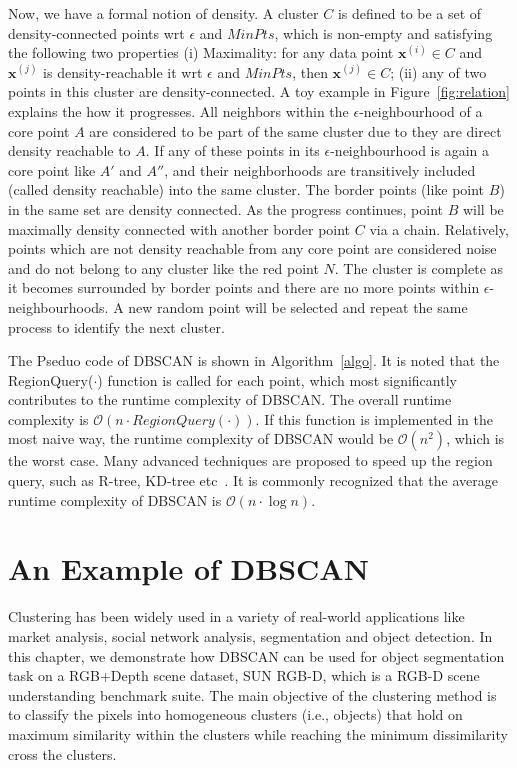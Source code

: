 Now, we have a formal notion of density. A cluster $C$ is defined to be a set of density-connected points wrt $\epsilon$ and $MinPts$, which is non-empty and satisfying the following two properties (i) Maximality: for any data point $\mathbf{x}^{(i)} \in C$ and $\mathbf{x}^{(j)}$ is density-reachable it wrt $\epsilon$ and $MinPts$, then $\mathbf{x}^{(j)} \in C$; (ii) any of two points in this cluster are density-connected. A toy 
example in Figure~\ref{fig:relation} explains the how it progresses. All 
neighbors within the $\epsilon$-neighbourhood of a core point $A$
are considered to be part of the same cluster due to they are direct 
density reachable to $A$. If any of these points in its 
$\epsilon$-neighbourhood is again a core point like 
$A'$ and $A''$, and their neighborhoods are transitively included (called 
density reachable) into the same cluster. The border points (like point $B$) in 
the same set are density connected. As the progress continues, point $B$ will 
be maximally density connected with another border point $C$ via a chain. 
Relatively, points which are not density reachable from any core point are 
considered noise and do not belong to any cluster like the red point $N$. The 
cluster is complete as it becomes surrounded by border points and there are no 
more points within $\epsilon$-neighbourhoods. A new random point will be 
selected and repeat the same process to identify the next cluster. 


The Pseduo code of DBSCAN is 
shown in Algorithm~\ref{algo}. It is noted that the RegionQuery($\cdot$) function is called for each point, which most significantly contributes to the runtime complexity of DBSCAN. The overall runtime complexity is $\mathcal{O}(n \cdot RegionQuery(\cdot))$. If this function is implemented in the most naive way, the runtime complexity of DBSCAN would be $\mathcal{O}(n^{2})$, which is the worst case. Many advanced techniques are proposed to speed up the region query, such as R-tree, KD-tree etc~\cite{schubert2017dbscan}. It is commonly recognized that the average runtime complexity of DBSCAN is $\mathcal{O}(n \cdot \log n)$.

\section{An Example of DBSCAN}

Clustering has been widely used in a variety of real-world applications like market analysis, social network analysis, segmentation and object detection. In this chapter, we demonstrate how DBSCAN can be used for object segmentation task on a RGB+Depth scene dataset, SUN RGB-D, which is a RGB-D scene understanding benchmark suite. The main objective of the clustering method is to classify the pixels into homogeneous clusters (i.e., objects) that hold on maximum similarity within the clusters while reaching the minimum dissimilarity cross the clusters. 


